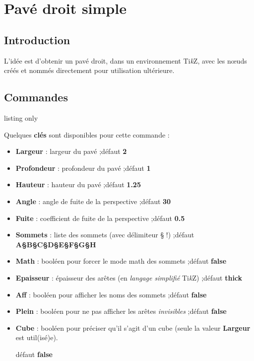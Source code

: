 \documentclass[a4paper,french,11pt]{article}
\providecommand\tikzlogo{Ti\textit{k}Z}
\let\TikZ\tikzlogo
\newcommand\Cle[1]{{\bfseries\sffamily\textlangle \textcolor{orange!75!black}{#1}\textrangle}}
\begin{document}
\section{Pavé droit \og simple \fg}\label{pave}

\subsection{Introduction}

\begin{tipblock}
L'idée est d'obtenir un pavé droit, dans un environnement \TikZ, avec les nœuds créés et nommés directement pour utilisation ultérieure.
\end{tipblock}

\subsection{Commandes}

\begin{PresCodeTexPL}{listing only}
\end{PresCodeTexPL}

\begin{cautionblock}
Quelques \Cle{clés} sont disponibles pour cette commande :

\begin{itemize}
	\item \Cle{Largeur} : largeur du pavé ;\hfill{}défaut \Cle{2}
	\item \Cle{Profondeur} : profondeur du pavé ;\hfill{}défaut \Cle{1}
	\item \Cle{Hauteur} : hauteur du pavé ;\hfill{}défaut \Cle{1.25}
	\item \Cle{Angle} : angle de fuite de la perspective ;\hfill{}défaut \Cle{30}
	\item \Cle{Fuite} : coefficient de fuite de la perspective ;\hfill{}défaut \Cle{0.5}
	\item \Cle{Sommets} : liste des sommets (avec délimiteur § !) ;\hfill{}défaut \Cle{A§B§C§D§E§F§G§H}
	\item \Cle{Math} : booléen pour forcer le mode math des sommets ;\hfill{}défaut \Cle{false}
	\item \Cle{Epaisseur} : épaisseur des arêtes (en \textit{langage simplifié} \TikZ) ;\hfill{}défaut \Cle{thick}
	\item \Cle{Aff} : booléen pour afficher les noms des sommets ;\hfill{}défaut \Cle{false}
	\item \Cle{Plein} : booléen pour ne pas afficher les arêtes \textit{invisibles} ;\hfill{}défaut \Cle{false}
	\item \Cle{Cube} : booléen pour préciser qu'il s'agit d'un cube (seule la valeur \Cle{Largeur} est util(isé)e).
	
	\hfill{}défaut \Cle{false}
\end{itemize}
\vspace*{-\baselineskip}\leavevmode
\end{cautionblock}
\end{document}
